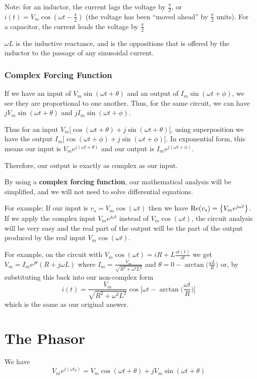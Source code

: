 \documentclass[12pt]{article}
\begin{document}
Note: for an inductor, the current lags the voltage by $\frac{\pi}{2}$, or $i(t) = V_m\cos(\omega t - \frac{\pi}{2})$ (the voltage has been ``moved ahead'' by $\frac{\pi}{2}$ units). For a capacitor, the current leads the voltage by $\frac{\pi}{2}$

$\omega L$ is the inductive reactance, and is the oppositions that is offered by the inductor to the passage of any sinusoidal current.

\subsubsection*{Complex Forcing Function}
If we have an input of $V_m\sin(\omega t + \theta)$ and an output of $I_m\sin(\omega t + \phi)$, we see they are proportional to one another. Thus, for the same circuit, we can have $jV_m\sin(\omega t + \theta)$ and $jI_m\sin(\omega t + \phi)$.

Thus for an input $V_m\bigl[\cos(\omega t + \theta) + j\sin(\omega t + \theta)\bigl]$, using superposition we have the output $I_m\bigl[\cos(\omega t + \phi) + j\sin(\omega t + \phi)\bigl]$. In exponential form, this means our input is $V_me^{j(\omega t + \theta)}$ and our output is $I_me^{j(\omega t + \phi)}$.

Therefore, our output is exactly as complex as our input.

By using a {\bf complex forcing function}, our mathematical analysis will be simplified, and we will not need to solve differential equations.

For example: If our input is $v_s = V_m\cos(\omega t)$ then we have ${\rm Re}(v_s) = \bigl\{V_me^{j\omega t}\bigl\}$. If we apply the complex input $V_me^{j\omega t}$ instead of $V_m\cos(\omega t)$, the circuit analysis will be very easy and the real part of the output will be the part of the output produced by the real input $V_m\cos(\omega t)$.

For example, on the circuit with $V_m \cos(\omega t) = iR + L\frac{\dd i(t)}{\dd t}$ we get $V_m = I_m e^{j\theta}(R + j\omega L)$ where $I_m = \frac{V_m}{\sqrt{R^2 + \omega^2L^2}}$ and $\theta = 0 - \arctan\bigl(\frac{\omega L}{R}\bigl)$ or, by substituting this back into our non-complex form \[ i(t) = \frac{V_m}{\sqrt{R^2 + \omega^2L^2}}\cos\bigg[\omega t - \arctan\bigl(\frac{\omega t}{R}\bigl)\bigg] \] which is the same as our original answer.

\section*{The Phasor}
We have \[ V_me^{j(\omega t _ \theta)} = V_m\cos(\omega t + \theta) + jV_m\sin(\omega t + \theta) \]
\end{document}
